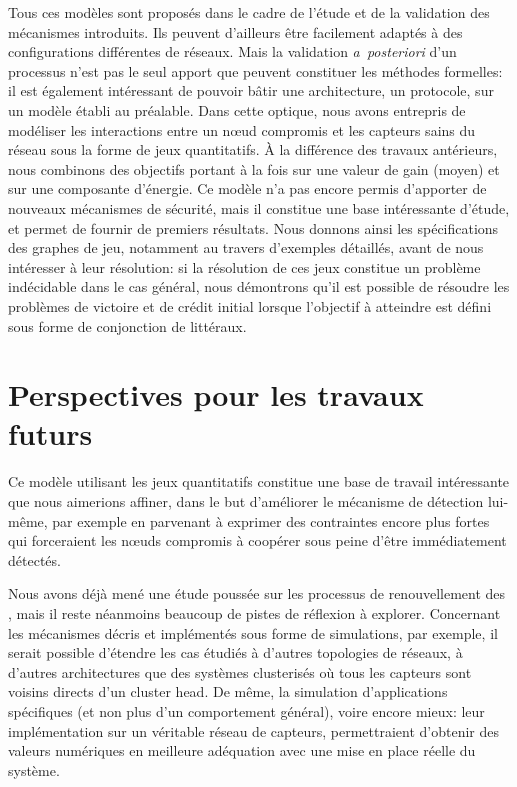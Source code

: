 Tous ces modèles sont proposés dans le cadre de l'étude et de la validation des mécanismes introduits.
Ils peuvent d'ailleurs être facilement adaptés à des configurations différentes de réseaux.
Mais la validation \textit{a~posteriori} d'un processus n'est pas le seul apport que peuvent constituer les méthodes formelles: il est également intéressant de pouvoir bâtir une architecture, un protocole, sur un modèle établi au préalable.
Dans cette optique, nous avons entrepris de modéliser les interactions entre un nœud compromis et les capteurs sains du réseau sous la forme de jeux quantitatifs.
À la différence des travaux antérieurs, nous combinons des objectifs portant à la fois sur une valeur de gain (moyen) et sur une composante d'énergie.
Ce modèle n'a pas encore permis d'apporter de nouveaux mécanismes de sécurité, mais il constitue une base intéressante d'étude, et permet de fournir de premiers résultats.
Nous donnons ainsi les spécifications des graphes de jeu, notamment au travers d'exemples détaillés, avant de nous intéresser à leur résolution: si la résolution de ces jeux constitue un problème indécidable dans le cas général, nous démontrons qu'il est possible de résoudre les problèmes de victoire et de crédit initial lorsque l'objectif à atteindre est défini sous forme de conjonction de littéraux.

\section{Perspectives pour les travaux futurs}

Ce modèle utilisant les jeux quantitatifs constitue une base de travail intéressante que nous aimerions affiner, dans le but d'améliorer le mécanisme de détection lui-même, par exemple en parvenant à exprimer des contraintes encore plus fortes qui forceraient les nœuds compromis à coopérer sous peine d'être immédiatement détectés.

Nous avons déjà mené une étude poussée sur les processus de renouvellement des \cnst, mais il reste néanmoins beaucoup de pistes de réflexion à explorer.
Concernant les mécanismes décris et implémentés sous forme de simulations, par exemple, il serait possible d'étendre les cas étudiés à d'autres topologies de réseaux, à d'autres architectures que des systèmes clusterisés où tous les capteurs sont voisins directs d'un cluster head.
De même, la simulation d'applications spécifiques (et non plus d'un comportement général), voire encore mieux: leur implémentation sur un véritable réseau de capteurs, permettraient d'obtenir des valeurs numériques en meilleure adéquation avec une mise en place réelle du système.

